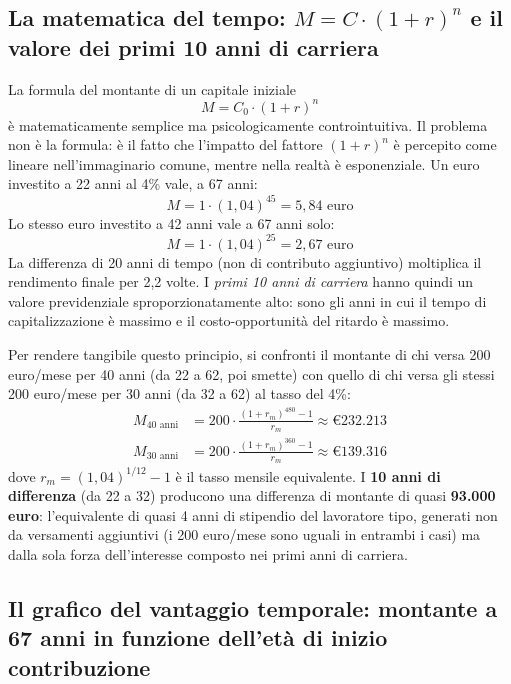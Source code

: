 \subsection{La matematica del tempo: $M = C \cdot (1+r)^n$
            e il valore dei primi 10 anni di carriera}
\label{sub:matematica_tempo}

\noindent
La formula del montante di un capitale iniziale
\begin{equation}
    M = C_0 \cdot (1+r)^n
    \label{eq:montante_cap}
\end{equation}
è matematicamente semplice ma psicologicamente controintuitiva.
Il problema non è la formula: è il fatto che l'impatto del fattore
$(1+r)^n$ è percepito come lineare nell'immaginario comune, mentre
nella realtà è esponenziale.
Un euro investito a 22 anni al 4\% vale, a 67 anni:
\[
    M = 1 \cdot (1{,}04)^{45} = 5{,}84 \text{ euro}
\]
Lo stesso euro investito a 42 anni vale a 67 anni solo:
\[
    M = 1 \cdot (1{,}04)^{25} = 2{,}67 \text{ euro}
\]
La differenza di 20 anni di tempo (non di contributo aggiuntivo)
moltiplica il rendimento finale per 2,2 volte.
I \emph{primi 10 anni di carriera} hanno quindi un valore previdenziale
sproporzionatamente alto: sono gli anni in cui il tempo di
capitalizzazione è massimo e il costo-opportunità del ritardo
è massimo.

\medskip
\noindent
Per rendere tangibile questo principio, si confronti il montante
di chi versa 200 euro/mese per 40 anni (da 22 a 62, poi smette)
con quello di chi versa gli stessi 200 euro/mese per 30 anni
(da 32 a 62) al tasso del 4\%:
\begin{align}
    M_{40 \text{ anni}} &= 200 \cdot
    \frac{(1+r_m)^{480}-1}{r_m} \approx \text{€}232.213
    \label{eq:m40} \\
    M_{30 \text{ anni}} &= 200 \cdot
    \frac{(1+r_m)^{360}-1}{r_m} \approx \text{€}139.316
    \label{eq:m30}
\end{align}
dove $r_m = (1{,}04)^{1/12}-1$ è il tasso mensile equivalente.
I \textbf{10 anni di differenza} (da 22 a 32) producono una differenza
di montante di quasi \textbf{93.000 euro}: l'equivalente di quasi
4 anni di stipendio del lavoratore tipo, generati non da versamenti
aggiuntivi (i 200 euro/mese sono uguali in entrambi i casi)
ma dalla sola forza dell'interesse composto nei primi anni di carriera.

\subsection{Il grafico del vantaggio temporale: montante a 67 anni
            in funzione dell'età di inizio contribuzione}
\label{sub:grafico_tempo}

